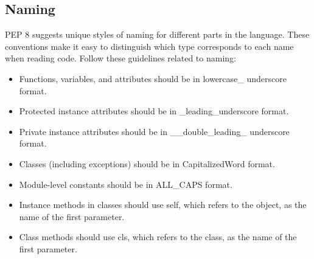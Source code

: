 \documentclass{article}
\begin{document}

\subsection{Naming}
PEP 8 suggests unique styles of naming for different parts in the
language. These conventions make it easy to distinguish which type
corresponds to each name when reading code. Follow these guidelines
related to naming:

\begin{itemize}
	\item Functions, variables, and attributes should be in lowercase\_
underscore format.
	\item Protected instance attributes should be in \_leading\_underscore
format.
	\item Private instance attributes should be in \_\_double\_leading\_
underscore format.
	\item Classes (including exceptions) should be in CapitalizedWord
format.
	\item Module-level constants should be in ALL\_CAPS format.
	\item Instance methods in classes should use self, which refers to the
object, as the name of the first parameter.
	\item Class methods should use cls, which refers to the class, as the
name of the first parameter.
	\end{itemize}
\end{document}
